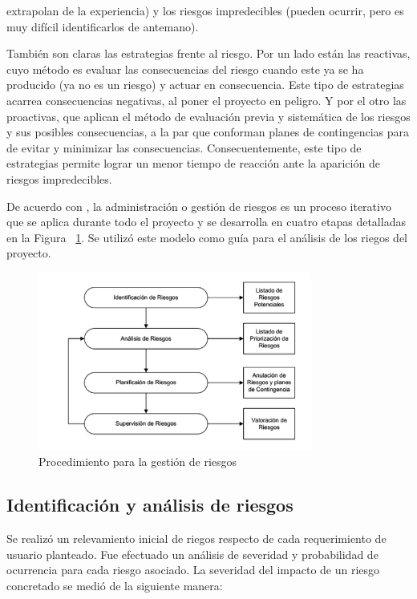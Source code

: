 		extrapolan de la experiencia) y los riesgos impredecibles (pueden ocurrir, pero es muy difícil identificarlos de antemano).
		\vspace{0.5cm}
		\par
     	También son claras las estrategias frente al riesgo. Por un lado están las reactivas, cuyo método es evaluar las consecuencias del riesgo cuando
 		este ya se ha producido (ya no es un riesgo) y actuar en consecuencia. Este tipo de estrategias acarrea consecuencias negativas, al poner el
 		proyecto en peligro. Y por el otro las proactivas, que aplican el método de evaluación previa y sistemática de los riesgos y sus posibles
 		consecuencias, a la par que conforman planes de contingencias para de evitar y minimizar las consecuencias. Consecuentemente, este tipo de
 		estrategias permite lograr un menor tiempo de reacción ante la aparición de riesgos impredecibles.
		\vspace{0.5cm}
		\par
		De acuerdo con \cite{etiqueta_riegos3}, la administración o gestión de riesgos es un proceso iterativo que se aplica durante todo el proyecto y se
		desarrolla en cuatro etapas detalladas en la Figura ~\ref{fig:riesgos}. Se utilizó este modelo como guía para el análisis de los riegos del
		proyecto.
		
		\begin{figure}[!h]
 		\begin{center}
  		\includegraphics[width=0.8\textwidth,keepaspectratio=true]{./images/riesgos}
  		\caption{Procedimiento para la gestión de riesgos}
  		\label{fig:riesgos}
 		\end{center}
		\end{figure}
		
		\subsection{Identificación y análisis de riesgos}
		\par
		Se realizó un relevamiento inicial de riegos respecto de cada requerimiento de usuario planteado. Fue efectuado un análisis de severidad y
		probabilidad de ocurrencia para cada riesgo asociado. La severidad	del	impacto	de un riesgo concretado	se medió de la siguiente
		manera:
		
